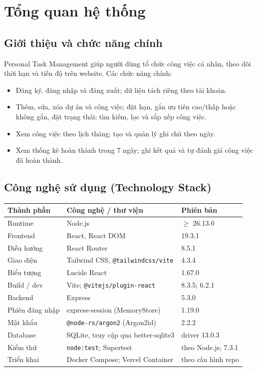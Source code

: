 \section{Tổng quan hệ thống}

\subsection{Giới thiệu và chức năng chính}
Personal Task Management giúp người dùng tổ chức công việc cá nhân, theo dõi thời hạn và tiến độ trên website. Các chức năng chính:
\begin{itemize}
  \item Đăng ký, đăng nhập và đăng xuất; dữ liệu tách riêng theo tài khoản.
  \item Thêm, sửa, xóa dự án và công việc; đặt hạn, gắn ưu tiên cao/thấp hoặc không gắn, đặt trạng thái; tìm kiếm, lọc và sắp xếp công việc.
  \item Xem công việc theo lịch tháng; tạo và quản lý ghi chú theo ngày.
  \item Xem thống kê hoàn thành trong 7 ngày; ghi kết quả và tự đánh giá công việc đã hoàn thành.
\end{itemize}

\subsection{Công nghệ sử dụng (Technology Stack)}
\begin{tabularx}{\linewidth}{@{}lXl@{}}
\toprule
\textbf{Thành phần} & \textbf{Công nghệ / thư viện} & \textbf{Phiên bản} \\
\midrule
Runtime & Node.js & $\geq$ 26.13.0 \\
Frontend & React, React DOM & 19.3.1 \\
Điều hướng & React Router & 8.5.1 \\
Giao diện & Tailwind CSS, \texttt{@tailwindcss/vite} & 4.3.4 \\
Biểu tượng & Lucide React & 1.67.0 \\
Build / dev & Vite; \texttt{@vitejs/plugin-react} & 8.3.5; 6.2.1 \\
Backend & Express & 5.3.0 \\
Phiên đăng nhập & express-session (MemoryStore) & 1.19.0 \\
Mật khẩu & \texttt{@node-rs/argon2} (Argon2id) & 2.2.2 \\
Database & SQLite, truy cập qua better-sqlite3 & driver 13.0.3 \\
Kiểm thử & \texttt{node:test}; Supertest & theo Node.js; 7.3.1 \\
Triển khai & Docker Compose; Vercel Container & theo cấu hình repo \\
\bottomrule
\end{tabularx}
